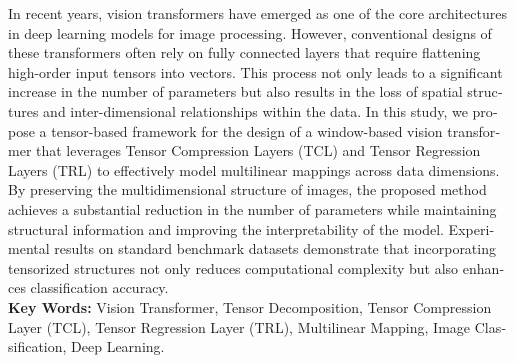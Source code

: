\begin{latin}
In recent years, vision transformers have emerged as one of the core architectures in deep learning models for image processing. However, conventional designs of these transformers often rely on fully connected layers that require flattening high-order input tensors into vectors. This process not only leads to a significant increase in the number of parameters but also results in the loss of spatial structures and inter-dimensional relationships within the data. In this study, we propose a tensor-based framework for the design of a window-based vision transformer that leverages Tensor Compression Layers (TCL) and Tensor Regression Layers (TRL) to effectively model multilinear mappings across data dimensions. By preserving the multidimensional structure of images, the proposed method achieves a substantial reduction in the number of parameters while maintaining structural information and improving the interpretability of the model. Experimental results on standard benchmark datasets demonstrate that incorporating tensorized structures not only reduces computational complexity but also enhances classification accuracy.
\\
\newline
{{\bf Key Words:}} Vision Transformer, Tensor Decomposition, Tensor Compression Layer (TCL), Tensor Regression Layer (TRL), Multilinear Mapping, Image Classification, Deep Learning.%
\newpage
\latinvtitle
%
\end{latin}

